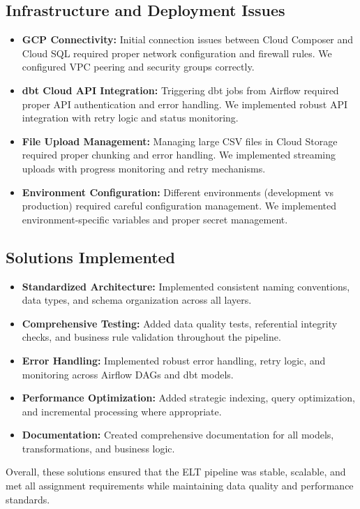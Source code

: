 \subsection{Infrastructure and Deployment Issues}

\begin{itemize}
  \item \textbf{GCP Connectivity:} Initial connection issues between Cloud Composer and Cloud SQL required proper network configuration and firewall rules. We configured VPC peering and security groups correctly.
  
  \item \textbf{dbt Cloud API Integration:} Triggering dbt jobs from Airflow required proper API authentication and error handling. We implemented robust API integration with retry logic and status monitoring.
  
  \item \textbf{File Upload Management:} Managing large CSV files in Cloud Storage required proper chunking and error handling. We implemented streaming uploads with progress monitoring and retry mechanisms.
  
  \item \textbf{Environment Configuration:} Different environments (development vs production) required careful configuration management. We implemented environment-specific variables and proper secret management.
\end{itemize}

\subsection{Solutions Implemented}

\begin{itemize}
  \item \textbf{Standardized Architecture:} Implemented consistent naming conventions, data types, and schema organization across all layers.
  
  \item \textbf{Comprehensive Testing:} Added data quality tests, referential integrity checks, and business rule validation throughout the pipeline.
  
  \item \textbf{Error Handling:} Implemented robust error handling, retry logic, and monitoring across Airflow DAGs and dbt models.
  
  \item \textbf{Performance Optimization:} Added strategic indexing, query optimization, and incremental processing where appropriate.
  
  \item \textbf{Documentation:} Created comprehensive documentation for all models, transformations, and business logic.
\end{itemize}

Overall, these solutions ensured that the ELT pipeline was stable, scalable, and met all assignment requirements while maintaining data quality and performance standards.